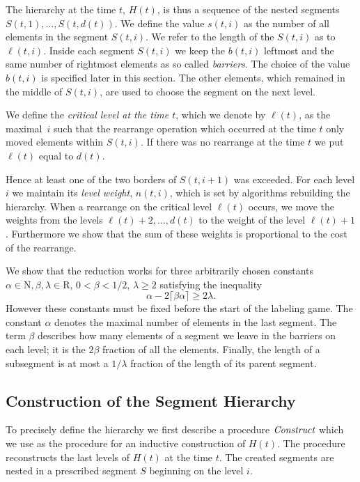 \documentclass{llncs}
\newcommand{\hb}[2]{b\left(#1, #2\right)}
\newcommand{\hn}[2]{n\left(#1, #2\right)}
\newcommand{\hs}[2]{s\left(#1, #2\right)}
\newcommand{\hS}[2]{S\left(#1, #2\right)}
\newcommand{\hH}[1]{H\left(#1\right)}
\newcommand{\hl}[2]{\ell(#1, #2)}
\newcommand{\rl}[1]{\ell\left(#1\right)}
\begin{document}
The hierarchy at the time $t$, $\hH{t}$, is thus a sequence of the nested segments $\hS{t}{1}, \dots, \hS{t}{d(t)}$.
We define the value $\hs{t}{i}$ as the number of all elements in the segment $\hS{t}{i}$.
We refer to the length of the $\hS{t}{i}$ as to $\hl{t}{i}$.
Inside each segment $\hS{t}{i}$ we keep the $\hb{t}{i}$ leftmost and the same number of rightmost elements as so called \emph{barriers}.
The choice of the value $\hb{t}{i}$ is specified later in this section.
The other elements, which remained in the middle of $\hS{t}{i}$, are used to choose the segment on the next level.

We define the \emph{critical level at the time $t$}, which we denote by $\rl{t}$, as the maximal~$i$ such that the rearrange operation which occurred at the time $t$ only moved elements within $\hS{t}{i}$.
If there was no rearrange at the time $t$ we put $\rl{t}$ equal to $d(t)$.

Hence at least one of the two borders of $\hS{t}{i + 1}$ was exceeded.
For each level $i$ we maintain its \emph{level weight}, $\hn{t}{i}$, which is set by algorithms rebuilding the hierarchy.
When a rearrange on the critical level $\rl{t}$ occurs, we move the weights from the levels $\rl{t} + 2, \dots, d(t)$ to the weight of the level $\rl{t} + 1$.
Furthermore we show that the sum of these weights is proportional to the cost of the rearrange.

We show that the reduction works for three arbitrarily chosen constants $\alpha \in \mathrm{N}, \beta, \lambda \in \mathrm{R}$, $0 < \beta < 1/2$, $\lambda \geq 2$ satisfying the inequality
\begin{equation}
\label{eq:choice}
\alpha - 2\lceil\beta\alpha\rceil \geq 2\lambda.
\end{equation}
However these constants must be fixed before the start of the labeling game.
The constant $\alpha$ denotes the maximal number of elements in the last segment.
The term $\beta$ describes how many elements of a segment we leave in the barriers on each level; it is the $2 \beta$ fraction of all the elements.
Finally, the length of a subsegment is at most a $1 / \lambda$ fraction of the length of its parent segment.

\subsection{Construction of the Segment Hierarchy}
To precisely define the hierarchy we first describe a procedure $\emph{Construct}$ which we use as the procedure for an inductive construction of $\hH{t}$.
The procedure reconstructs the last levels of $\hH{t}$ at the time $t$.
The created segments are nested in a prescribed segment $S$ beginning on the level $i$.
\end{document}
